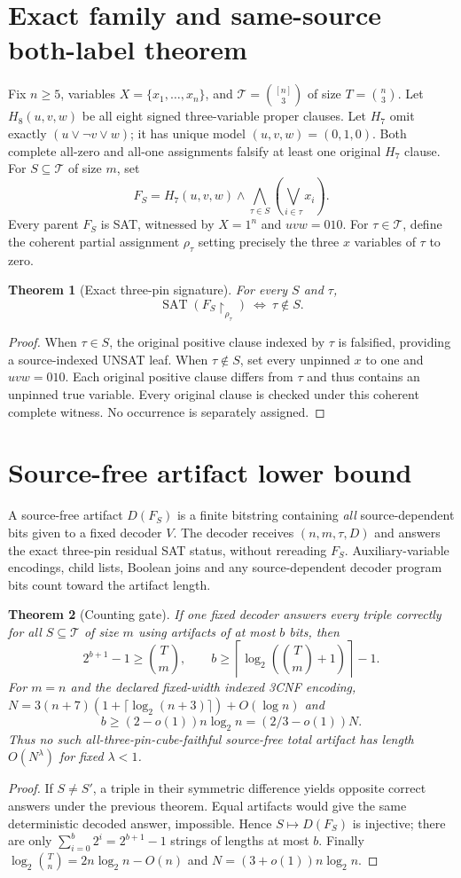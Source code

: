 \documentclass[11pt]{article}
\newtheorem{theorem}{Theorem}
\begin{document}
\section*{Exact family and same-source both-label theorem}
Fix $n\geq5$, variables $X=\{x_1,\ldots,x_n\}$, and
$\mathcal T=\binom{[n]}3$ of size $T=\binom n3$.
Let $H_8(u,v,w)$ be all eight signed three-variable proper clauses.
Let $H_7$ omit exactly $(u\vee\neg v\vee w)$; it has unique
model $(u,v,w)=(0,1,0)$. Both complete all-zero and all-one
assignments falsify at least one original $H_7$ clause.
For $S\subseteq\mathcal T$ of size $m$, set
\[
F_S=H_7(u,v,w)\land
\bigwedge_{\tau\in S}\left(\bigvee_{i\in\tau}x_i\right).
\]
Every parent $F_S$ is SAT, witnessed by $X=1^n$ and $u v w=010$.
For $\tau\in\mathcal T$, define the coherent partial assignment
$\rho_\tau$ setting precisely the three $x$ variables of $\tau$ to zero.
\begin{theorem}[Exact three-pin signature]
For every $S$ and $\tau$,
\[
\operatorname{SAT}(F_S\!\upharpoonright_{\rho_\tau})
\ \Longleftrightarrow\ \tau\notin S.
\]
\end{theorem}
\begin{proof}
When $\tau\in S$, the original positive clause indexed by $\tau$
is falsified, providing a source-indexed UNSAT leaf.
When $\tau\notin S$, set every unpinned $x$ to one and $uvw=010$.
Each original positive clause differs from $\tau$ and thus contains
an unpinned true variable. Every original clause is checked under
this coherent complete witness. No occurrence is separately assigned.
\end{proof}
\section*{Source-free artifact lower bound}
A source-free artifact $D(F_S)$ is a finite bitstring containing
\emph{all} source-dependent bits given to a fixed decoder $V$.
The decoder receives $(n,m,\tau,D)$ and answers the exact three-pin
residual SAT status, without rereading $F_S$.
Auxiliary-variable encodings, child lists, Boolean joins and any
source-dependent decoder program bits count toward the artifact length.
\begin{theorem}[Counting gate]
If one fixed decoder answers every triple correctly for all
$S\subseteq\mathcal T$ of size $m$ using artifacts of at most $b$ bits,
then
\[
2^{b+1}-1\geq {T\choose m},\qquad
b\geq\left\lceil\log_2({T\choose m}+1)\right\rceil-1.
\]
For $m=n$ and the declared fixed-width indexed 3CNF encoding,
$N=3(n+7)(1+\lceil\log_2(n+3)\rceil)+O(\log n)$ and
\[
b\geq(2-o(1))n\log_2n=(2/3-o(1))N.
\]
Thus no such all-three-pin-cube-faithful source-free total artifact
has length $O(N^\lambda)$ for fixed $\lambda<1$.
\end{theorem}
\begin{proof}
If $S\neq S'$, a triple in their symmetric difference yields opposite
correct answers under the previous theorem. Equal artifacts would
give the same deterministic decoded answer, impossible.
Hence $S\mapsto D(F_S)$ is injective; there are only
$\sum_{i=0}^b2^i=2^{b+1}-1$ strings of lengths at most $b$.
Finally $\log_2{T\choose n}=2n\log_2n-O(n)$ and
$N=(3+o(1))n\log_2n$.
\end{proof}
\end{document}
